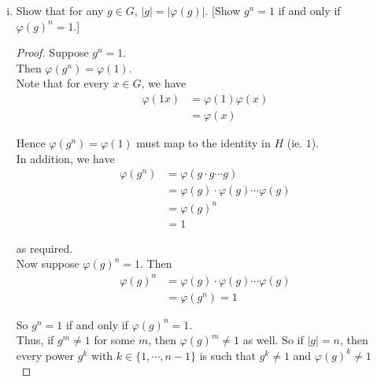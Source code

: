 \documentclass[11pt, reqno]{amsart}
\theoremstyle{plain}
\theoremstyle{definition}
\theoremstyle{example}
\begin{document}
\begin{enumerate}[1.]
\begin{enumerate}[(a)]
\begin{enumerate}[(i)]
\begin{proof}
for every $x, y \in G$. Since $\varphi$ is a bijection, for every element $y \in H$, $\exists x_y \in G$ such that $\varphi(x_y) = y$. Hence, this shows that $H$ is an abelian group as well.\\

Now suppose $H$ is abelian. Consider $\varphi^{-1}$, which is a bijection from $H \to G$ and a homomorphism (hence an isomorphism). Then we can apply the same argument as above, just swapping the $H$ and $G$.\\

Hence, $H$ abelian $\implies G$ abelian, and we get $G$ abelian $\iff H$ abelian.

\end{proof}

\item Show that for any $g \in G$, $|g| = |\varphi(g)|$. [Show $g^n = 1$ if and only if $\varphi(g)^n = 1$.]
\begin{proof}
Suppose $g^n = 1$.\\

Then $\varphi(g^n) = \varphi(1)$.\\

Note that for every $x \in G$, we have
\begin{align*}
\varphi(1x) &= \varphi(1)\varphi(x)\\
&= \varphi(x)
\end{align*}

Hence $\varphi(g^n) = \varphi(1)$ must map to the identity in $H$ (ie. $1$).\\

In addition, we have
\begin{align*}
\varphi(g^n) &= \varphi(g \cdot g \cdots g)\\
&= \varphi(g) \cdot \varphi(g) \cdots \varphi(g)\\
&= \varphi(g)^n\\
&= 1
\end{align*}

as required.\\

Now suppose $\varphi(g)^n = 1$. Then
\begin{align*}
\varphi(g)^n &= \varphi(g) \cdot \varphi(g) \cdots \varphi(g)\\
&= \varphi(g^n) = 1
\end{align*}

So $g^n = 1$ if and only if $\varphi(g)^n = 1$.\\

Thus, if $g^m \neq 1$ for some $m$, then $\varphi(g)^m \neq 1$ as well. So if $|g| = n$, then every power $g^k$ with $k \in \{1, \cdots, n-1\}$ is such that $g^k \neq 1$ and $\varphi(g)^k \neq 1$\\


\end{proof}
\end{enumerate}
\end{enumerate}
\end{enumerate}
\end{document}
